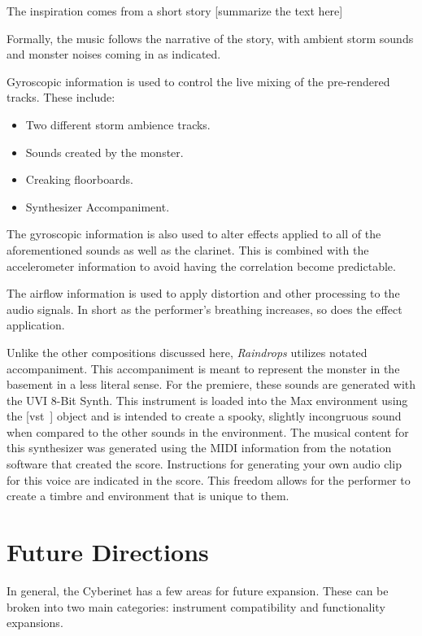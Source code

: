 The inspiration comes from a short story [summarize the text here]

Formally, the music follows the narrative of the story, with ambient storm sounds and monster noises coming in as indicated. 

Gyroscopic information is used to control the live mixing of the pre-rendered tracks. These include:
\begin{itemize}
    \item Two different storm ambience tracks.
    \item Sounds created by the monster.
    \item Creaking floorboards.
    \item Synthesizer Accompaniment.
\end{itemize}

The gyroscopic information is also used to alter effects applied to all of the aforementioned sounds as well as the clarinet. This is combined with the accelerometer information to avoid having the correlation become predictable.

The airflow information is used to apply distortion and other processing to the audio signals. In short as the performer's breathing increases, so does the effect application.

Unlike the other compositions discussed here, \textit{Raindrops} utilizes notated accompaniment. This accompaniment is meant to represent the monster in the basement in a less literal sense. For the premiere, these sounds are generated with the UVI 8-Bit Synth. This instrument is loaded into the Max environment using the [vst~] object and is intended to create a spooky, slightly incongruous sound when compared to the other sounds in the environment. 
The musical content for this synthesizer was generated using the MIDI information from the notation software that created the score. Instructions for generating your own audio clip for this voice are indicated in the score. This freedom allows for the performer to create a timbre and environment that is unique to them.

\chapter{Future Directions}

In general, the Cyberinet has a few areas for future expansion. These can be broken into two main categories: instrument compatibility and functionality expansions. 

